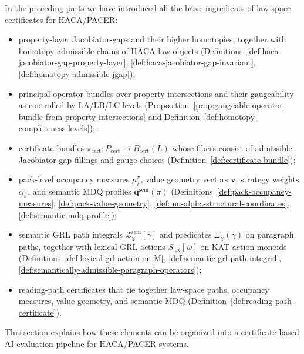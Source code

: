 \documentclass[11pt]{book}
\theoremstyle{plain}
\theoremstyle{definition}
\theoremstyle{remark}
\begin{document}
In the preceding parts we have introduced all the basic ingredients of
law-space certificates for HACA/PACER:
\begin{itemize}
  \item property-layer Jacobiator-gaps and their higher homotopies,
        together with homotopy admissible chains of HACA law-objects
        (Definitions~\ref{def:haca-jacobiator-gap-property-layer},
        \ref{def:haca-jacobiator-gap-invariant},
        \ref{def:homotopy-admissible-jgap});
  \item principal operator bundles over property intersections and
        their gaugeability as controlled by LA/LB/LC levels
        (Proposition~\ref{prop:gaugeable-operator-bundle-from-property-intersections}
        and Definition~\ref{def:homotopy-completeness-levels});
  \item certificate bundles $\pi_{\mathrm{cert}}:P_{\mathrm{cert}}\to
        B_{\mathrm{cert}}(L)$ whose fibers consist of admissible
        Jacobiator-gap fillings and gauge choices
        (Definition~\ref{def:certificate-bundle});
  \item pack-level occupancy measures $\mu_i^\pi$, value geometry
        vectors $\mathbf{v}$, strategy weights $\alpha_i^\pi$, and
        semantic MDQ profiles $\mathbf{q}^{\mathrm{sem}}(\pi)$
        (Definitions~\ref{def:pack-occupancy-measures},
         \ref{def:pack-value-geometry},
         \ref{def:mu-alpha-structural-coordinates},
         \ref{def:semantic-mdq-profile});
  \item semantic GRL path integrals
        $\mathcal{Z}^{\mathrm{sem}}_\chi[\gamma]$ and predicates
        $\Xi_\chi(\gamma)$ on paragraph paths, together with lexical
        GRL actions $S_{\mathrm{lex}}[w]$ on KAT action monoids
        (Definitions~\ref{def:lexical-grl-action-on-M},
         \ref{def:semantic-grl-path-integral},
         \ref{def:semantically-admissible-paragraph-operators});
  \item reading-path certificates that tie together law-space paths,
        occupancy measures, value geometry, and semantic MDQ
        (Definition~\ref{def:reading-path-certificate}).
\end{itemize}
This section explains how these elements can be organized into a
certificate-based AI evaluation pipeline for HACA/PACER systems.
\end{document}
